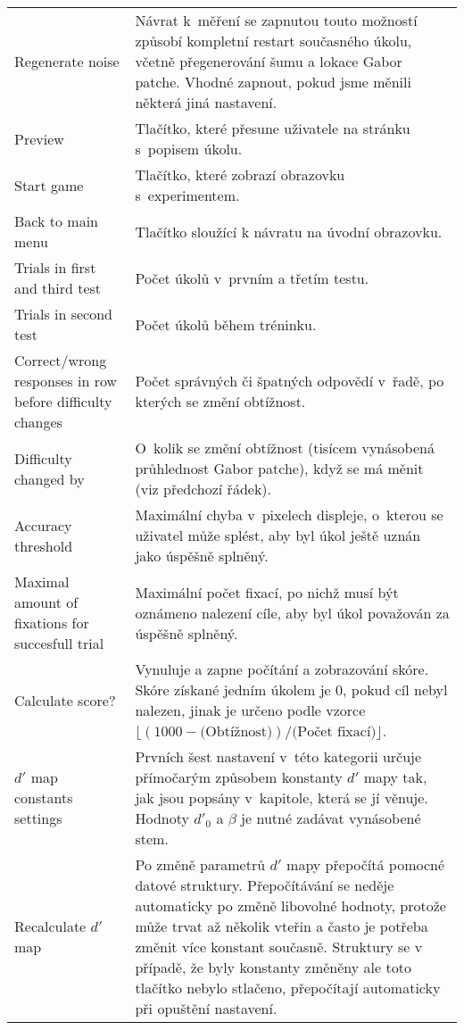{\begin{longtable}{R{0.25\textwidth}p{0.7\textwidth}}
Regenerate noise & Návrat k~měření se zapnutou touto možností způsobí kompletní
restart současného úkolu, včetně přegenerování šumu a lokace Gabor patche.
Vhodné zapnout, pokud jsme měnili některá jiná nastavení. \\

Preview & Tlačítko, které přesune uživatele na stránku s~popisem úkolu. \\ 

Start game & Tlačítko, které zobrazí obrazovku s~experimentem. \\

Back to main menu & Tlačítko sloužící k návratu na úvodní obrazovku. \\

Trials in first and third test & Počet úkolů  v~prvním a třetím testu. \\

Trials in second test & Počet úkolů během tréninku. \\

Correct/wrong responses in row before difficulty changes & Počet správných či
špatných odpovědí v~řadě, po kterých se změní obtížnost. \\

Difficulty changed by & O~kolik se změní obtížnost (tisícem vynásobená
průhlednost Gabor patche), když se má měnit (viz předchozí řádek). \\

Accuracy threshold & Maximální chyba v~pixelech displeje, o~kterou se uživatel
může splést, aby byl úkol ještě uznán jako úspěšně splněný. \\

Maximal amount of fixations for succesfull trial & Maximální počet fixací, po
nichž musí být oznámeno nalezení cíle, aby byl úkol považován za úspěšně
splněný. \\

Calculate score? & Vynuluje a zapne počítání a zobrazování skóre. Skóre získané
jedním úkolem je 0, pokud cíl nebyl nalezen, jinak je určeno podle vzorce
$\lfloor(1000 - \text{(Obtížnost)})/\text{(Počet fixací)}\rfloor$. \\

$d'$ map constants settings & Prvních šest nastavení v~této kategorii určuje
přímočarým způsobem konstanty $d'$ mapy tak, jak jsou popsány v~kapitole, která
se jí věnuje. Hodnoty $d'_0$ a $\beta$ je nutné zadávat vynásobené stem. \\

Recalculate $d'$ map & Po změně parametrů $d'$ mapy přepočítá pomocné datové
struktury. Přepočítávání se neděje automaticky po změně libovolné
hodnoty, protože může trvat až několik vteřin a často je potřeba změnit více
konstant současně. Struktury se v případě, že byly konstanty změněny ale toto
tlačítko nebylo stlačeno, přepočítají automaticky při opuštění nastavení.  \\


\end{longtable}}
